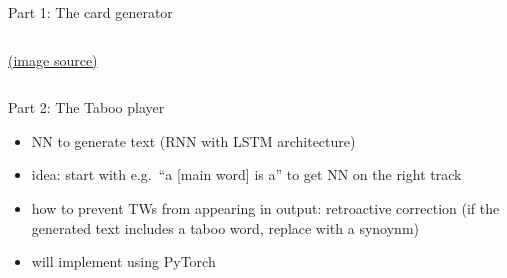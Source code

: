 \documentclass[11pt]{beamer}
\begin{document}
\begin{frame}{Part 1: The card generator}
\begin{columns}
\begin{column}{0.4\textwidth}
		
		\vspace{\baselineskip}
		\hfill {\tiny \href{https://www.amazon.com/Hasbro-Gaming-Buzzer-Amazon-Exclusive/dp/B06XYL6Y5C}{(image source)} }
		
	\end{column}
	
\end{columns}

\end{frame}



\begin{frame}{Part 2: The Taboo player}
	
	\begin{itemize}
		\item NN to generate text (RNN with LSTM architecture)
		\item idea: start with e.g.\ ``a [main word] is a'' to get NN on the right track
		\item how to prevent TWs from appearing in output: retroactive correction (if the generated text includes a taboo word, replace with a synoynm)
		\item will implement using PyTorch
	\end{itemize}
	
\end{frame}


%
%
%

\end{document}
